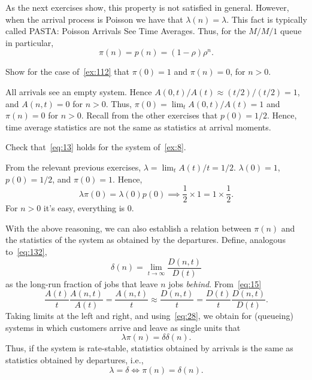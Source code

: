 As the next exercises show, this property is not satisfied in general.
However, when the arrival process is Poisson we have that $\lambda(n)=\lambda$.
This fact is typically called PASTA: Poisson Arrivals See Time Averages.
Thus, for the $M/M/1$ queue in particular,
\begin{equation*}
  \pi(n) = p(n) = (1-\rho)\rho^n.
\end{equation*}

\begin{exercise}\label{ex:8} 
Show for the case of~\cref{ex:112} that $\pi(0)=1$ and $\pi(n)=0$, for $n>0$.
\begin{solution}
  All arrivals see an empty system. Hence $A(0,t)/A(t) \approx (t/2)/(t/2) = 1$, and $A(n,t)=0$ for $n>0$. Thus, $\pi(0) = \lim_t A(0,t)/A(t) = 1$ and $\pi(n)=0$ for $n>0$. Recall from the other exercises that $p(0)=1/2$. Hence, time average statistics are not the same as statistics at arrival moments. 
\end{solution}

\end{exercise}

\begin{exercise}
  Check that~\cref{eq:13}  holds for the system of~\cref{ex:8}.
\begin{solution}
From the relevant previous exercises, $\lambda = \lim_t A(t)/t = 1/2$. $\lambda(0)=1$, $p(0)=1/2$, and $\pi(0)=1$. Hence,
\begin{equation*}
  \lambda \pi(0) = \lambda(0) p(0) \implies  \frac 1 2 \times 1 = 1\times \frac 1 2.
\end{equation*}
For $n>0$ it's easy, everything is 0.
\end{solution}
\end{exercise}





With the above reasoning, we can also establish a relation between $\pi(n)$ and the statistics of the system as obtained by the departures.
Define, analogous to~\cref{eq:132}, 
\begin{equation}
  \label{eq:33}
  \delta(n) = \lim_{t\to\infty} \frac{D(n,t)}{D(t)}
\end{equation}
as the long-run fraction of jobs that leave $n$ jobs \emph{behind}.
From~\cref{eq:15}
\begin{equation*}
\frac{A(t)}t \frac{A(n,t)}{A(t)} = \frac{A(n,t)}t \approx \frac{D(n,t)}t 
= \frac{D(t)}t \frac{D(n,t)}{D(t)}.
\end{equation*}
Taking limits at the left and right, and using~\cref{eq:28}, we obtain for (queueing) systems in which customers arrive and leave as single units that
\begin{equation}
  \label{eq:36}
  \lambda \pi(n) = \delta \delta(n).
\end{equation}
Thus, if the system is rate-stable, statistics obtained  by arrivals is the same as statistics obtained by departures, i.e., 
\begin{equation}
  \label{eq:39}
\lambda = \delta \iff  \pi(n) = \delta(n).
\end{equation}


